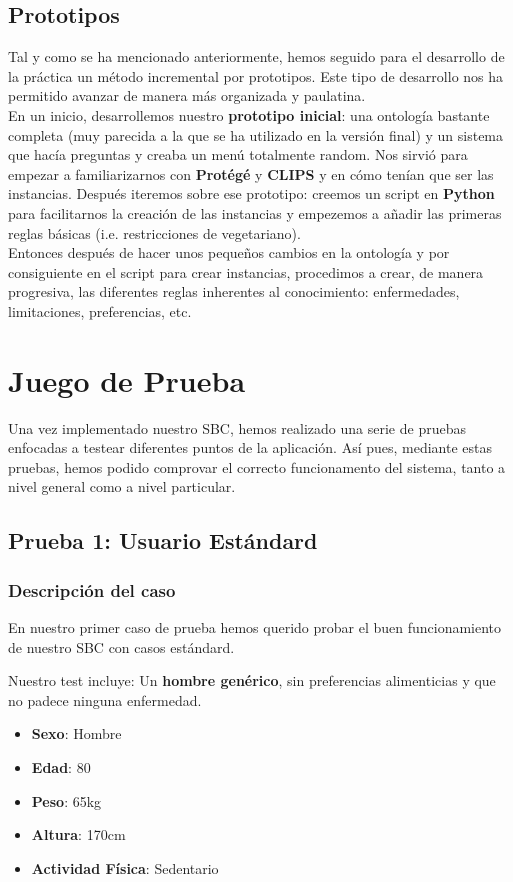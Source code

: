 \documentclass[12]{article}
\begin{document}
\subsection{Prototipos}
Tal y como se ha mencionado anteriormente, hemos seguido para el desarrollo de la práctica un método incremental por prototipos. Este tipo de desarrollo nos ha permitido avanzar de manera más organizada y paulatina. 
\\
En un inicio, desarrollemos nuestro \textbf{prototipo inicial}: una ontología bastante completa (muy parecida a la que se ha utilizado en la versión final) y un sistema que hacía preguntas y creaba un menú totalmente random.  Nos sirvió para empezar a familiarizarnos con \textbf{Protégé} y \textbf{CLIPS} y en cómo tenían que ser las instancias. Después iteremos sobre ese prototipo: creemos un script en \textbf{Python} para facilitarnos la creación de las instancias y empezemos a añadir las primeras reglas básicas (i.e. restricciones de vegetariano). 
\\
Entonces después de hacer unos pequeños cambios en la ontología y por consiguiente en el script para crear instancias, procedimos a crear, de manera progresiva, las diferentes reglas inherentes al conocimiento: enfermedades, limitaciones, preferencias, etc.

\section{Juego de Prueba}
Una vez implementado nuestro SBC, hemos realizado una serie de pruebas enfocadas a testear diferentes puntos de la aplicación. Así pues, mediante estas pruebas, hemos podido comprovar el correcto funcionamento del sistema, tanto a nivel general como a nivel particular.

\subsection{Prueba 1: Usuario Estándard}
\subsubsection{Descripción del caso}
En nuestro primer caso de prueba hemos querido probar el buen funcionamiento de nuestro SBC con casos estándard. 
\medskip

Nuestro test incluye:
Un \textbf{hombre genérico}, sin preferencias alimenticias y que no padece ninguna enfermedad.

\begin{itemize}
\item \textbf{Sexo}: Hombre
\item \textbf{Edad}: 80
\item \textbf{Peso}: 65kg
\item \textbf{Altura}: 170cm
\item \textbf{Actividad Física}: Sedentario
\end{itemize}
\end{document}
